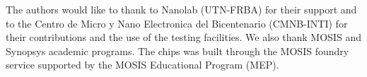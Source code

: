 The authors would like to thank to Nanolab (UTN-FRBA) for their support and to the Centro de Micro y Nano Electronica del Bicentenario (CMNB-INTI) \cite{cmnb} for their contributions and the use of the testing facilities. 
We also thank MOSIS and Synopsys \cite{synopsys} academic programs. The chips was built through the MOSIS foundry service supported by the MOSIS Educational Program (MEP).
